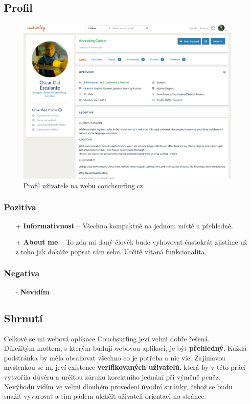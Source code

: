 \newpage
\subsection{Profil}
\begin{figure}[h]
    \centering
    \includegraphics[width=1.0\textwidth]{media/couchsurfing/profile.png}
    \caption{Profil uživatele na webu couchsurfing.cz}
    \label{fig:couchsurfing:profile}
\end{figure}
\subsubsection*{Pozitiva}
\begin{itemize}
    \item[+] \textbf{Informativnost} -- Všechno kompaktně na jednom místě a přehledně.
    \item[+] \textbf{About me} -- To zda mi daný člověk bude vyhovovat častokrát zjistíme už z toho jak dokáže popsat sám sebe. Určitě vítaná funkcionalita.
\end{itemize}
\subsubsection*{Negativa}
\begin{itemize}
    \item[-] \textbf{Nevidím}
\end{itemize}



\newpage
\subsection{Shrnutí}
Celkově se mi webová aplikace Couchsurfing jeví velmi dobře řešená.\\

Důležitým mottem, s kterým buduji webovou aplikaci, je být \textbf{přehledný}. Každá podstránka by měla obsahovat všechno co je potřeba a nic víc. Zajímavou myšlenkou se mi jeví existence \textbf{verifikovaných uživatelů}, která by v této práci vytvořila důvěru a určitou záruku korektního jednání při výměně peněz. Nevýhodu vidím ve velmi dlouhém provedení úvodní stránky, čehož se budu snažit vyvarovat a tím pádem ulehčit uživateli orientaci na stránce.